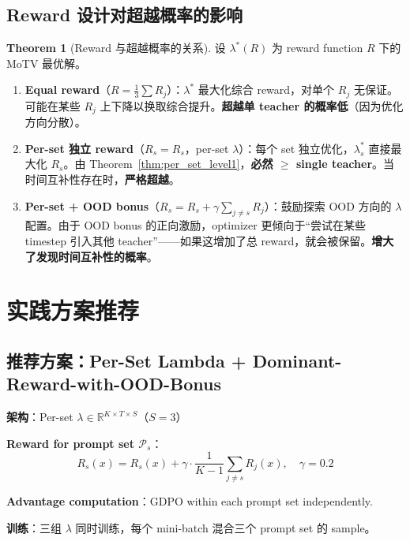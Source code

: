 \documentclass[11pt,a4paper]{article}
\newcommand{\R}{\mathbb{R}}
\newcommand{\reward}{R}
\theoremstyle{definition}
\newtheorem{theorem}{Theorem}
\begin{document}
\subsection{Reward 设计对超越概率的影响}

\begin{theorem}[Reward 与超越概率的关系]
\label{thm:reward_design}
设 $\lambda^*(\reward)$ 为 reward function $\reward$ 下的 MoTV 最优解。

\begin{enumerate}[leftmargin=1.5em]
\item \textbf{Equal reward}（$\reward = \frac{1}{3}\sum R_j$）：$\lambda^*$ 最大化综合 reward，对单个 $R_j$ 无保证。可能在某些 $R_j$ 上下降以换取综合提升。\textbf{超越单 teacher 的概率低}（因为优化方向分散）。

\item \textbf{Per-set 独立 reward}（$\reward_s = R_s$，per-set $\lambda$）：每个 set 独立优化，$\lambda^*_s$ 直接最大化 $R_s$。由 Theorem~\ref{thm:per_set_level1}，\textbf{必然 $\geq$ single teacher}。当时间互补性存在时，\textbf{严格超越}。

\item \textbf{Per-set + OOD bonus}（$\reward_s = R_s + \gamma \sum_{j\neq s} R_j$）：鼓励探索 OOD 方向的 $\lambda$ 配置。由于 OOD bonus 的正向激励，optimizer 更倾向于``尝试在某些 timestep 引入其他 teacher''——如果这增加了总 reward，就会被保留。\textbf{增大了发现时间互补性的概率}。
\end{enumerate}
\end{theorem}

\section{实践方案推荐}
\label{sec:recommendation}

\subsection{推荐方案：Per-Set Lambda + Dominant-Reward-with-OOD-Bonus}

\begin{tcolorbox}[colback=green!5, colframe=green!50!black, title=推荐方案]
\textbf{架构}：Per-set $\lambda \in \R^{K \times T \times S}$（$S=3$）

\textbf{Reward for prompt set $\mathcal{P}_s$}：
\begin{equation}
\boxed{
\reward_s(x) = R_s(x) + \gamma \cdot \frac{1}{K-1}\sum_{j \neq s} R_j(x), \quad \gamma = 0.2
}
\end{equation}

\textbf{Advantage computation}：GDPO within each prompt set independently.

\textbf{训练}：三组 $\lambda$ 同时训练，每个 mini-batch 混合三个 prompt set 的 sample。
\end{tcolorbox}
\end{document}

